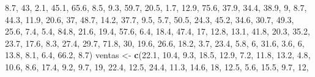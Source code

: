 \documentclass[]{book}
\newenvironment{Shaded}{\begin{snugshade}}{\end{snugshade}}
\newcommand{\KeywordTok}[1]{\textcolor[rgb]{0.13,0.29,0.53}{\textbf{#1}}}
\newcommand{\DecValTok}[1]{\textcolor[rgb]{0.00,0.00,0.81}{#1}}
\newcommand{\FloatTok}[1]{\textcolor[rgb]{0.00,0.00,0.81}{#1}}
\newcommand{\StringTok}[1]{\textcolor[rgb]{0.31,0.60,0.02}{#1}}
\newcommand{\NormalTok}[1]{#1}
\begin{document}
\begin{Shaded}
\begin{Highlighting}[]
    \FloatTok{8.7}\NormalTok{, }\DecValTok{43}\NormalTok{, }\FloatTok{2.1}\NormalTok{, }\FloatTok{45.1}\NormalTok{, }\FloatTok{65.6}\NormalTok{, }\FloatTok{8.5}\NormalTok{, }\FloatTok{9.3}\NormalTok{, }\FloatTok{59.7}\NormalTok{, }\FloatTok{20.5}\NormalTok{, }\FloatTok{1.7}\NormalTok{, }\FloatTok{12.9}\NormalTok{, }\FloatTok{75.6}\NormalTok{, }\FloatTok{37.9}\NormalTok{, }\FloatTok{34.4}\NormalTok{, }
    \FloatTok{38.9}\NormalTok{, }\DecValTok{9}\NormalTok{, }\FloatTok{8.7}\NormalTok{, }\FloatTok{44.3}\NormalTok{, }\FloatTok{11.9}\NormalTok{, }\FloatTok{20.6}\NormalTok{, }\DecValTok{37}\NormalTok{, }\FloatTok{48.7}\NormalTok{, }\FloatTok{14.2}\NormalTok{, }\FloatTok{37.7}\NormalTok{, }\FloatTok{9.5}\NormalTok{, }\FloatTok{5.7}\NormalTok{, }\FloatTok{50.5}\NormalTok{, }\FloatTok{24.3}\NormalTok{, }
    \FloatTok{45.2}\NormalTok{, }\FloatTok{34.6}\NormalTok{, }\FloatTok{30.7}\NormalTok{, }\FloatTok{49.3}\NormalTok{, }\FloatTok{25.6}\NormalTok{, }\FloatTok{7.4}\NormalTok{, }\FloatTok{5.4}\NormalTok{, }\FloatTok{84.8}\NormalTok{, }\FloatTok{21.6}\NormalTok{, }\FloatTok{19.4}\NormalTok{, }\FloatTok{57.6}\NormalTok{, }\FloatTok{6.4}\NormalTok{, }\FloatTok{18.4}\NormalTok{, }
    \FloatTok{47.4}\NormalTok{, }\DecValTok{17}\NormalTok{, }\FloatTok{12.8}\NormalTok{, }\FloatTok{13.1}\NormalTok{, }\FloatTok{41.8}\NormalTok{, }\FloatTok{20.3}\NormalTok{, }\FloatTok{35.2}\NormalTok{, }\FloatTok{23.7}\NormalTok{, }\FloatTok{17.6}\NormalTok{, }\FloatTok{8.3}\NormalTok{, }\FloatTok{27.4}\NormalTok{, }\FloatTok{29.7}\NormalTok{, }\FloatTok{71.8}\NormalTok{, }
    \DecValTok{30}\NormalTok{, }\FloatTok{19.6}\NormalTok{, }\FloatTok{26.6}\NormalTok{, }\FloatTok{18.2}\NormalTok{, }\FloatTok{3.7}\NormalTok{, }\FloatTok{23.4}\NormalTok{, }\FloatTok{5.8}\NormalTok{, }\DecValTok{6}\NormalTok{, }\FloatTok{31.6}\NormalTok{, }\FloatTok{3.6}\NormalTok{, }\DecValTok{6}\NormalTok{, }\FloatTok{13.8}\NormalTok{, }\FloatTok{8.1}\NormalTok{, }\FloatTok{6.4}\NormalTok{, }\FloatTok{66.2}\NormalTok{, }
    \FloatTok{8.7}\NormalTok{)}
\NormalTok{ventas <-}\StringTok{ }\KeywordTok{c}\NormalTok{(}\FloatTok{22.1}\NormalTok{, }\FloatTok{10.4}\NormalTok{, }\FloatTok{9.3}\NormalTok{, }\FloatTok{18.5}\NormalTok{, }\FloatTok{12.9}\NormalTok{, }\FloatTok{7.2}\NormalTok{, }\FloatTok{11.8}\NormalTok{, }\FloatTok{13.2}\NormalTok{, }\FloatTok{4.8}\NormalTok{, }\FloatTok{10.6}\NormalTok{, }\FloatTok{8.6}\NormalTok{, }\FloatTok{17.4}\NormalTok{, }
    \FloatTok{9.2}\NormalTok{, }\FloatTok{9.7}\NormalTok{, }\DecValTok{19}\NormalTok{, }\FloatTok{22.4}\NormalTok{, }\FloatTok{12.5}\NormalTok{, }\FloatTok{24.4}\NormalTok{, }\FloatTok{11.3}\NormalTok{, }\FloatTok{14.6}\NormalTok{, }\DecValTok{18}\NormalTok{, }\FloatTok{12.5}\NormalTok{, }\FloatTok{5.6}\NormalTok{, }\FloatTok{15.5}\NormalTok{, }\FloatTok{9.7}\NormalTok{, }\DecValTok{12}\NormalTok{, }

\end{Highlighting}
\end{Shaded}
\end{document}
